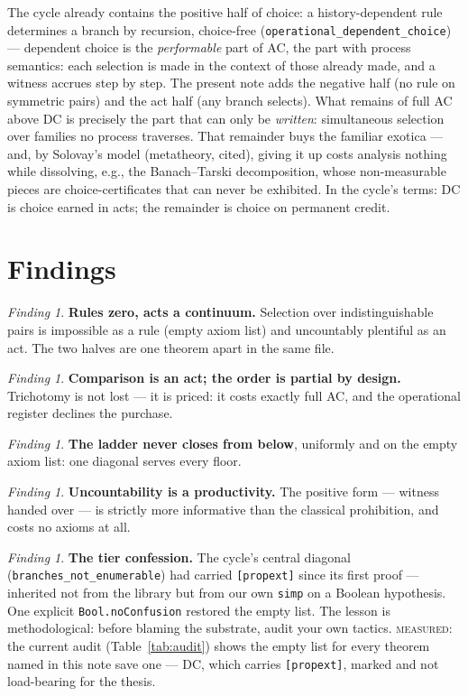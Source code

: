 \documentclass[11pt]{article}
\theoremstyle{remark}
\newtheorem{finding}[thm]{Finding}
\newcommand{\MEASURED}{\textsc{measured}}
\begin{document}
The cycle already contains the positive half of choice: a
history-dependent rule determines a branch by recursion, choice-free
(\texttt{operational\_dependent\_choice}) --- dependent choice is the
\emph{performable} part of AC, the part with process semantics: each
selection is made in the context of those already made, and a witness
accrues step by step.  The present note adds the negative half (no rule
on symmetric pairs) and the act half (any branch selects).  What remains
of full AC above DC is precisely the part that can only be
\emph{written}: simultaneous selection over families no process
traverses.  That remainder buys the familiar exotica --- and, by
Solovay's model (metatheory, cited), giving it up costs analysis nothing
while dissolving, e.g., the Banach--Tarski decomposition, whose
non-measurable pieces are choice-certificates that can never be
exhibited.  In the cycle's terms: DC is choice earned in acts; the
remainder is choice on permanent credit.

\section{Findings}

\begin{finding}
\textbf{Rules zero, acts a continuum.}  Selection over
indistinguishable pairs is impossible as a rule (empty axiom list) and
uncountably plentiful as an act.  The two halves are one theorem apart
in the same file.
\end{finding}

\begin{finding}
\textbf{Comparison is an act; the order is partial by design.}
Trichotomy is not lost --- it is priced: it costs exactly full AC, and
the operational register declines the purchase.
\end{finding}

\begin{finding}
\textbf{The ladder never closes from below}, uniformly and on the empty
axiom list: one diagonal serves every floor.
\end{finding}

\begin{finding}
\textbf{Uncountability is a productivity.}  The positive form ---
witness handed over --- is strictly more informative than the classical
prohibition, and costs no axioms at all.
\end{finding}

\begin{finding}
\textbf{The tier confession.}  The cycle's central diagonal
(\texttt{branches\_not\_enumerable}) had carried \texttt{[propext]}
since its first proof --- inherited not from the library but from our
own \texttt{simp} on a Boolean hypothesis.  One explicit
\texttt{Bool.noConfusion} restored the empty list.  The lesson is
methodological: before blaming the substrate, audit your own tactics.
\MEASURED{}: the current audit (Table~\ref{tab:audit}) shows the empty
list for every theorem named in this note save one --- DC, which carries
\texttt{[propext]}, marked and not load-bearing for the thesis.
\end{finding}
\end{document}
